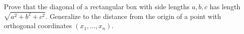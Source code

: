 Prove that the diagonal of a rectangular box with side lengths $a,b,c$ has length $\sqrt{a^2+b^2+c^2}$. Generalize to the distance from the origin of a point with orthogonal coordinates $(x_1,\ldots,x_n)$.

